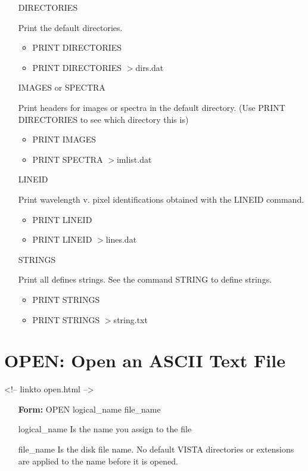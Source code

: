 \begin{itemize}
  \item[DIRECTORIES\hfill]{Print the default directories.
  \begin{itemize}
    \item{PRINT DIRECTORIES}
    \item{PRINT DIRECTORIES $>$dirs.dat}
  \end{itemize}
}

  \item[IMAGES or SPECTRA\hfill]{Print headers for images or spectra in the
       default directory.  (Use PRINT DIRECTORIES to see which directory
       this is)
  \begin{itemize}
    \item{PRINT IMAGES}
    \item{PRINT SPECTRA $>$imlist.dat}
  \end{itemize}
}

  \item[LINEID\hfill]{Print wavelength v. pixel identifications obtained
       with the LINEID command.
  \begin{itemize}
    \item{PRINT LINEID}
    \item{PRINT LINEID $>$lines.dat}
  \end{itemize}
}

  \item[STRINGS\hfill]{Print all defines strings.  See the command STRING
       to define strings.
  \begin{itemize}
    \item{PRINT STRINGS}
    \item{PRINT STRINGS $>$string.txt}
  \end{itemize}
}
\end{itemize}

\section{OPEN: Open an ASCII Text File}
\begin{rawhtml}
<!-- linkto open.html -->
\end{rawhtml}
\begin{itemize}
  \item[\textbf{Form: } OPEN logical\_name file\_name\hfill]{}
  \item[logical\_name]{Is the name you assign to the file}
  \item[file\_name]{Is the disk file name.  No default VISTA directories or
       extensions are applied to the name before it is opened.}
\end{itemize}

